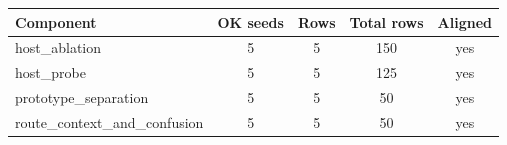 \begin{tabularx}{\linewidth}{lcccc}
\toprule
Component & OK seeds & Rows & Total rows & Aligned \\
\midrule
host\_ablation & 5 & 5 & 150 & yes \\
host\_probe & 5 & 5 & 125 & yes \\
prototype\_separation & 5 & 5 & 50 & yes \\
route\_context\_and\_confusion & 5 & 5 & 50 & yes \\
\bottomrule
\end{tabularx}